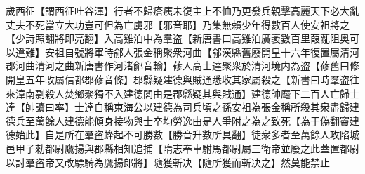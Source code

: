 歲西征【謂西征吐谷渾】行者不歸瘡痍未復主上不恤乃更發兵親擊高麗天下必大亂丈夫不死當立大功豈可但為亡虜邪【邪音耶】乃集無賴少年得數百人使安祖將之【少詩照翻將即亮翻】入高雞泊中為羣盗【新唐書曰高雞泊廣袤數百里葭薍阻奥可以違難】安祖自號將軍時鄃人張金稱聚衆河曲【鄃漢縣舊廢開皇十六年復置屬清河郡河曲清河之曲新唐書作河渚鄃音輸】蓚人高士達聚衆於清河境内為盗【蓚舊曰修開皇五年改屬信都郡蓚音條】郡縣疑建德與賊通悉收其家屬殺之【新書曰時羣盗往來漳南剽殺人焚鄉聚獨不入建德閭由是郡縣疑其與賊通】建德帥麾下二百人亡歸士達【帥讀曰率】士達自稱東海公以建德為司兵頃之孫安祖為張金稱所殺其衆盡歸建德兵至萬餘人建德能傾身接物與士卒均勞逸由是人爭附之為之致死【為于偽翻竇建德始此】自是所在羣盗蜂起不可勝數【勝音升數所具翻】徒衆多者至萬餘人攻陷城邑甲子勑都尉鷹揚與郡縣相知追捕【隋志奉車駙馬都尉屬三衛帝並廢之此蓋置都尉以討羣盗帝又改驃騎為鷹揚郎將】隨獲斬决【隨所獲而斬决之】然莫能禁止

